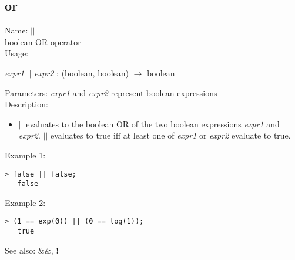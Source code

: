 \subsection{ or }
\noindent Name: \textbf{$||$}\\
boolean OR operator\\

\noindent Usage: 
\begin{center}
\emph{expr1} \textbf{$||$} \emph{expr2} : (\textsf{boolean}, \textsf{boolean}) $\rightarrow$ \textsf{boolean}\\
\end{center}
Parameters: 
\emph{expr1} and \emph{expr2} represent boolean expressions\\

\noindent Description: \begin{itemize}

\item \textbf{$||$} evaluates to the boolean OR of the two
   boolean expressions \emph{expr1} and \emph{expr2}. \textbf{$||$} evaluates to 
   true iff at least one of \emph{expr1} or \emph{expr2} evaluate to true.
\end{itemize}
\noindent Example 1: 
\begin{center}\begin{minipage}{14.8cm}\begin{Verbatim}[frame=single]
   > false || false;
   false
\end{Verbatim}
\end{minipage}\end{center}
\noindent Example 2: 
\begin{center}\begin{minipage}{14.8cm}\begin{Verbatim}[frame=single]
   > (1 == exp(0)) || (0 == log(1));
   true
\end{Verbatim}
\end{minipage}\end{center}
See also: \textbf{$\&\&$}, \textbf{!}

